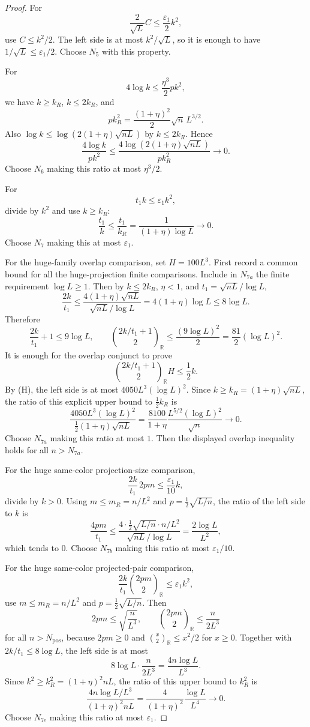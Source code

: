\begin{proof}
For
\[
\frac{2}{\sqrt L}C\le \frac{\varepsilon_1}{2}k^2,
\]
use \(C\le k^2/2\).  The left side is at most \(k^2/\sqrt L\), so it is enough
to have \(1/\sqrt L\le\varepsilon_1/2\).  Choose \(N_5\) with this property.

For
\[
4\log k\le \frac{\eta^3}{2}pk^2,
\]
we have \(k\ge k_R\), \(k\le2k_R\), and
\[
pk_R^2=\frac{(1+\eta)^2}{2}\sqrt n\,L^{3/2}.
\]
Also \(\log k\le\log(2(1+\eta)\sqrt{nL})\) by \(k\le2k_R\).  Hence
\[
\frac{4\log k}{pk^2}
\le
\frac{4\log(2(1+\eta)\sqrt{nL})}{p k_R^2}\to0.
\]
Choose \(N_6\) making this ratio at most \(\eta^3/2\).

For
\[
t_1k\le\varepsilon_1k^2,
\]
divide by \(k^2\) and use \(k\ge k_R\):
\[
\frac{t_1}{k}\le\frac{t_1}{k_R}
=\frac{1}{(1+\eta)\log L}\to0.
\]
Choose \(N_7\) making this at most \(\varepsilon_1\).

For the huge-family overlap comparison, set \(H=100L^3\).  First record a
common bound for all the huge-projection finite comparisons.  Include in
\(N_{7a}\) the finite requirement \(\log L\ge1\).  Then by \(k\le2k_R\),
\(\eta<1\), and \(t_1=\sqrt{nL}/\log L\),
\[
\frac{2k}{t_1}
\le \frac{4(1+\eta)\sqrt{nL}}{\sqrt{nL}/\log L}
=4(1+\eta)\log L
\le8\log L.
\]
Therefore
\[
\frac{2k}{t_1}+1\le 9\log L,
\qquad
\binom{2k/t_1+1}{2}_{\mathbb R}
\le \frac{(9\log L)^2}{2}
=\frac{81}{2}(\log L)^2.
\tag{H}
\]
It is enough for the overlap conjunct to prove
\[
\binom{2k/t_1+1}{2}_{\mathbb R}H\le\frac12 k.
\]
By (H), the left side is at most \(4050L^3(\log L)^2\).  Since
\(k\ge k_R=(1+\eta)\sqrt{nL}\), the ratio of this explicit upper bound to
\(\frac12 k_R\) is
\[
\frac{4050L^3(\log L)^2}{\frac12(1+\eta)\sqrt{nL}}
=\frac{8100}{1+\eta}\frac{L^{5/2}(\log L)^2}{\sqrt n}\to0.
\]
Choose \(N_{7a}\) making this ratio at most \(1\).  Then the displayed
overlap inequality holds for all \(n>N_{7a}\).

For the huge same-color projection-size comparison,
\[
\frac{2k}{t_1}\,2pm\le \frac{\varepsilon_1}{10}k,
\]
divide by \(k>0\).  Using \(m\le m_R=n/L^2\) and
\(p=\frac12\sqrt{L/n}\), the ratio of the left side to \(k\) is
\[
\frac{4pm}{t_1}
\le
\frac{4\cdot\frac12\sqrt{L/n}\cdot n/L^2}{\sqrt{nL}/\log L}
=\frac{2\log L}{L^2},
\]
which tends to \(0\).  Choose \(N_{7b}\) making this ratio at most
\(\varepsilon_1/10\).

For the huge same-color projected-pair comparison,
\[
\frac{2k}{t_1}\binom{2pm}{2}_{\mathbb R}\le \varepsilon_1k^2,
\]
use \(m\le m_R=n/L^2\) and \(p=\frac12\sqrt{L/n}\).  Then
\[
2pm\le \sqrt{\frac{n}{L^3}},
\qquad
\binom{2pm}{2}_{\mathbb R}\le \frac{n}{2L^3}
\]
for all \(n>N_{\mathrm{pos}}\), because \(2pm\ge0\) and
\(\binom{x}{2}_{\mathbb R}\le x^2/2\) for \(x\ge0\).  Together with
\(2k/t_1\le8\log L\), the left side is at most
\[
8\log L\cdot \frac{n}{2L^3}=\frac{4n\log L}{L^3}.
\]
Since \(k^2\ge k_R^2=(1+\eta)^2nL\), the ratio of this upper bound to
\(k_R^2\) is
\[
\frac{4n\log L/L^3}{(1+\eta)^2nL}
=\frac{4}{(1+\eta)^2}\frac{\log L}{L^4}\to0.
\]
Choose \(N_{7e}\) making this ratio at most \(\varepsilon_1\).


\end{proof}
